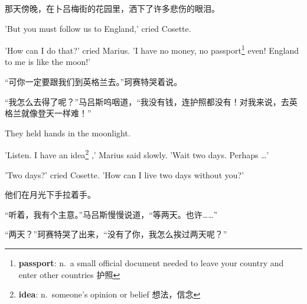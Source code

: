 \documentclass[fontset=ubuntu, zihao=5]{ctexart}
\begin{document}
\begin{paracol}{2}
\switchcolumn

\sectionbreak

那天傍晚，在卜吕梅街的花园里，洒下了许多悲伤的眼泪。

\switchcolumn*

'But you must follow us to England,' cried Cosette.

'How can I do that?' cried Marius. 'I have no money, no
passport\footnote{\textbf{passport}: n. a small official document needed to
  leave your country and enter other countries 护照} even! England to me is
like the moon!'

\switchcolumn

“可你一定要跟我们到英格兰去。”珂赛特哭着说。

“我怎么去得了呢？”马吕斯呜咽道，“我没有钱，连护照都没有！对我来说，去英格兰就像登天一样难！”

\switchcolumn*

They held hands in the moonlight.

'Listen. I have an idea\footnote{\textbf{idea}: n. someone's opinion or
  belief 想法，信念} ,' Marius said slowly. 'Wait two days. Perhaps \ldots{}'

'Two days?' cried Cosette. 'How can I live two days without you?'

\switchcolumn

他们在月光下手拉着手。


“听着，我有个主意。”马吕斯慢慢说道，“等两天。也许……”


“两天？”珂赛特哭了出来，“没有了你，我怎么挨过两天呢？”

\end{paracol}

\clearpage
\end{document}
